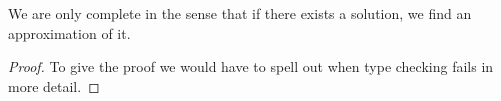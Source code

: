 



\begin{theorem}[Completeness]
    We are only complete in the sense that if there exists a solution, we find
    an approximation of it.
\end{theorem}
\begin{proof}
    To give the proof we would have to spell out when type checking fails in
    more detail.
\end{proof}

